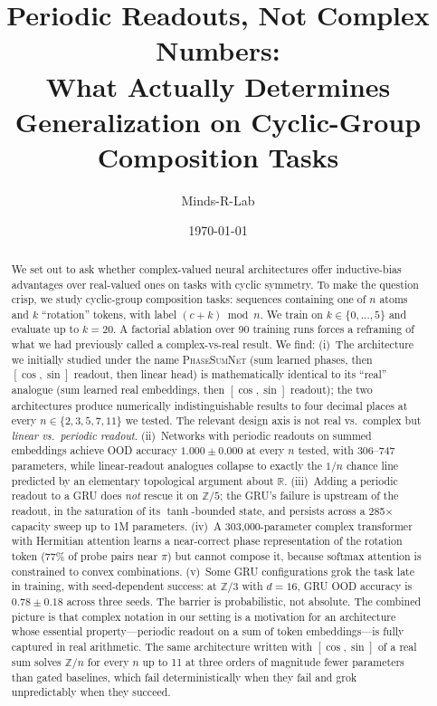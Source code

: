 \documentclass[11pt]{article}
\title{
  Periodic Readouts, Not Complex Numbers:\\
  \large What Actually Determines Generalization on
  Cyclic-Group Composition Tasks
}
\author{Minds-R-Lab}
\date{\today}
\theoremstyle{definition}
\newcommand{\R}{\mathbb{R}}
\newcommand{\Z}{\mathbb{Z}}
\begin{document}
\maketitle

\begin{abstract}
We set out to ask whether complex-valued neural architectures offer
inductive-bias advantages over real-valued ones on tasks with cyclic
symmetry. To make the question crisp, we study cyclic-group
composition tasks: sequences containing one of $n$ atoms and $k$
``rotation'' tokens, with label $(c + k) \bmod n$. We train on
$k \in \{0,\ldots,5\}$ and evaluate up to $k = 20$.
A factorial ablation over 90 training runs forces a reframing of
what we had previously called a complex-vs-real result. We find:
(i)~The architecture we initially studied under the name
\textsc{PhaseSumNet} (sum learned phases, then $[\cos, \sin]$
readout, then linear head) is mathematically identical to its
``real'' analogue (sum learned real embeddings, then $[\cos, \sin]$
readout); the two architectures produce numerically indistinguishable
results to four decimal places at every $n \in \{2,3,5,7,11\}$ we
tested. The relevant design axis is not real vs.\ complex but
\emph{linear vs.\ periodic readout}.
(ii)~Networks with periodic readouts on summed embeddings achieve OOD
accuracy $1.000 \pm 0.000$ at every $n$ tested, with 306--747
parameters, while linear-readout analogues collapse to exactly the
$1/n$ chance line predicted by an elementary topological argument
about $\R$.
(iii)~Adding a periodic readout to a GRU does \emph{not} rescue it
on $\Z/5$; the GRU's failure is upstream of the readout, in the
saturation of its $\tanh$-bounded state, and persists across a
285$\times$ capacity sweep up to 1M parameters.
(iv)~A 303{,}000-parameter complex transformer with Hermitian
attention learns a near-correct phase representation of the rotation
token (77\% of probe pairs near $\pi$) but cannot compose it,
because softmax attention is constrained to convex combinations.
(v)~Some GRU configurations grok the task late in training, with
seed-dependent success: at $\Z/3$ with $d=16$, GRU OOD accuracy is
$0.78 \pm 0.18$ across three seeds. The barrier is probabilistic,
not absolute.
The combined picture is that complex notation in our setting is a
motivation for an architecture whose essential property---periodic
readout on a sum of token embeddings---is fully captured in real
arithmetic. The same architecture written with $[\cos, \sin]$ of a
real sum solves $\Z/n$ for every $n$ up to 11 at three orders of
magnitude fewer parameters than gated baselines, which fail
deterministically when they fail and grok unpredictably when they
succeed.
\end{abstract}
\end{document}
